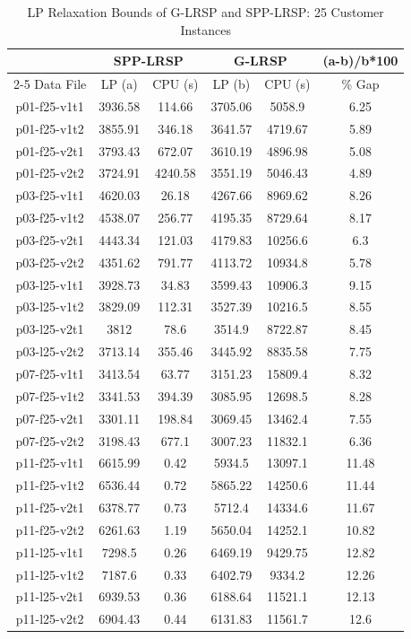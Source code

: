 \begin{table}[h]%
\centering
\caption{LP Relaxation Bounds of G-LRSP and SPP-LRSP: 25 Customer Instances}\label{comparesp-eb-gr1}
\begin {tabular}[h]{|c|c|c|c|c|c|}\hline
\mbox{} &  \multicolumn{2}{|c|}{ SPP-LRSP} & \multicolumn{2}{|c|}{G-LRSP} &  (a-b)/b*100\\\cline{2-5}
 Data File  & LP (a)    & CPU (s) &  LP (b) &   CPU (s) &  \% Gap   \\\hline
p01-f25-v1t1 &  3936.58 &   114.66  & 3705.06 & 5058.9  &   6.25    \\
p01-f25-v1t2 &  3855.91 &   346.18  & 3641.57 & 4719.67 &   5.89    \\
p01-f25-v2t1 &  3793.43 &   672.07  & 3610.19 & 4896.98 &   5.08    \\
p01-f25-v2t2 &  3724.91 &   4240.58 & 3551.19 & 5046.43 &   4.89    \\\hline
p03-f25-v1t1 &  4620.03 &   26.18   & 4267.66 & 8969.62 &   8.26    \\
p03-f25-v1t2 &  4538.07 &   256.77  & 4195.35 & 8729.64 &   8.17    \\
p03-f25-v2t1 &  4443.34 &   121.03  & 4179.83 & 10256.6 &   6.3 \\
p03-f25-v2t2 &  4351.62 &   791.77  & 4113.72 & 10934.8 &   5.78    \\\hline
p03-l25-v1t1 &  3928.73 &   34.83   & 3599.43 & 10906.3 &   9.15    \\
p03-l25-v1t2 &  3829.09 &   112.31  & 3527.39 & 10216.5 &   8.55    \\
p03-l25-v2t1 &  3812    &   78.6    & 3514.9  & 8722.87 &   8.45    \\
p03-l25-v2t2 &  3713.14 &   355.46  & 3445.92 & 8835.58 &   7.75    \\\hline
p07-f25-v1t1 &  3413.54 &   63.77   & 3151.23 & 15809.4 &   8.32    \\
p07-f25-v1t2 &  3341.53 &   394.39  & 3085.95 & 12698.5 &   8.28    \\
p07-f25-v2t1 &  3301.11 &   198.84  & 3069.45 & 13462.4 &   7.55    \\
p07-f25-v2t2 &  3198.43 &   677.1   & 3007.23 & 11832.1 &   6.36    \\\hline
p11-f25-v1t1 &  6615.99 &   0.42    & 5934.5  & 13097.1 &   11.48   \\
p11-f25-v1t2 &  6536.44 &   0.72    & 5865.22 & 14250.6 &   11.44   \\
p11-f25-v2t1 &  6378.77 &   0.73    & 5712.4  & 14334.6 &   11.67   \\
p11-f25-v2t2 &  6261.63 &   1.19    & 5650.04 & 14252.1 &   10.82   \\\hline
p11-l25-v1t1 &  7298.5  &   0.26    & 6469.19 & 9429.75 &   12.82   \\
p11-l25-v1t2 &  7187.6  &   0.33    & 6402.79 & 9334.2  &   12.26   \\
p11-l25-v2t1 &  6939.53 &   0.36    & 6188.64 & 11521.1 &   12.13   \\
p11-l25-v2t2 &  6904.43 &   0.44    & 6131.83 & 11561.7 &   12.6    \\\hline
\end{tabular}
\end{table}

